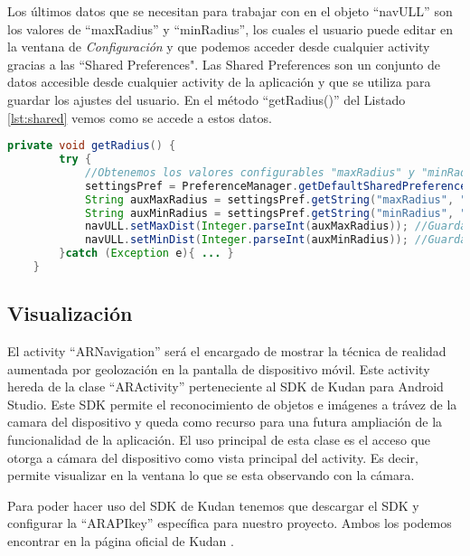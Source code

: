 Los últimos datos que se necesitan para trabajar con en el objeto ``navULL'' son los valores de ``maxRadius'' y ``minRadius'', los cuales el usuario puede editar en la ventana de \textit{Configuración} y que podemos acceder desde cualquier activity gracias a las ``Shared Preferences". Las Shared Preferences son un conjunto de datos accesible desde cualquier activity de la aplicación y que se utiliza para guardar los ajustes del usuario. En el método ``getRadius()'' del Listado \ref{lst:shared} vemos como se accede a estos datos.

\begin{lstlisting}[language=java, caption={Fichero \texttt{ARNavigation.java}, código que se encarga de guardar los valores de ``maxDist'' y ``minDist'' del objeto ``navULL''},  label={lst:shared}]
    private void getRadius() {
        try {
            //Obtenemos los valores configurables "maxRadius" y "minRadius" en la ventana de "Configuracion"
            settingsPref = PreferenceManager.getDefaultSharedPreferences(getContext());
            String auxMaxRadius = settingsPref.getString("maxRadius", "null");
            String auxMinRadius = settingsPref.getString("minRadius", "null");
            navULL.setMaxDist(Integer.parseInt(auxMaxRadius)); //Guardamos el valor "maxRadius"
            navULL.setMinDist(Integer.parseInt(auxMinRadius)); //Guardamos el valor "minRadius"
        }catch (Exception e){ ... }
    }
\end{lstlisting}


\subsection{Visualización}

El activity ``ARNavigation'' será el encargado de mostrar la técnica de realidad aumentada por geolozación en la pantalla de dispositivo móvil. Este activity hereda de la clase ``ARActivity'' perteneciente al  SDK de Kudan para Android Studio. Este SDK permite el reconocimiento de objetos e imágenes a trávez de la camara del dispositivo y queda como recurso para una futura ampliación de la funcionalidad de la aplicación. El uso principal de esta clase es el acceso que otorga a cámara del dispositivo como vista principal del activity. Es decir, permite visualizar en la ventana lo que se esta observando con la cámara.

Para poder hacer uso del SDK de Kudan tenemos que descargar el SDK y configurar la ``ARAPIkey'' específica para nuestro proyecto. Ambos los podemos encontrar en la página oficial de Kudan \cite{URL::kudan}. 

